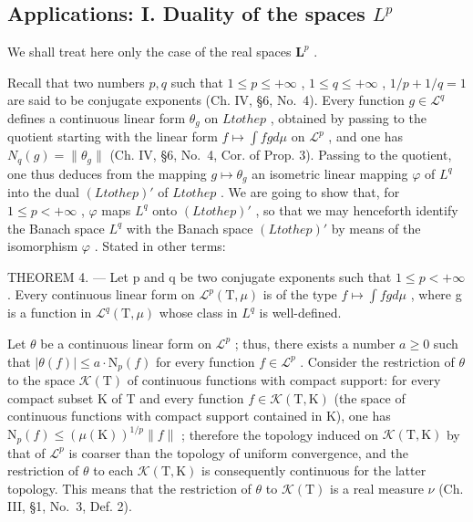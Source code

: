 \subsection{\texorpdfstring{Applications: I. Duality of the spaces \(L^{p}\)}{Applications: I. Duality of the spaces L to the p}}

We shall treat here only the case of the real spaces \(\mathbf{L}^p\) .

Recall that two numbers \(p, q\) such that \(1 \leqslant p \leqslant +\infty\) , \(1 \leqslant q \leqslant +\infty\) , \(1/p + 1/q = 1\) are said to be conjugate exponents (Ch. IV, §6, No.~4). Every function \(g \in \mathcal{L}^q\) defines a continuous linear form \(\theta_g\) on \(L to the p\) , obtained by passing to the quotient starting with the linear form \(f \mapsto \int fg d\mu\) on \(\mathcal{L}^p\) , and one has \(N_q(g) = \| \theta_g \|\) (Ch. IV, §6, No.~4, Cor. of Prop. 3). Passing to the quotient, one thus deduces from the mapping \(g \mapsto \theta_g\) an isometric linear mapping \(\varphi\) of \(L^q\) into the dual \((L to the p)'\) of \(L to the p\) . We are going to show that, for \(1 \leqslant p < +\infty\) , \(\varphi\) maps \(L^q\) onto \((L to the p)'\) , so that we may henceforth identify the Banach space \(L^q\) with the Banach space \((L to the p)'\) by means of the isomorphism \(\varphi\) . Stated in other terms:

THEOREM 4. --- Let p and q be two conjugate exponents such that \(1 \leqslant p < +\infty\) . Every continuous linear form on \(\mathcal{L}^{p}(\mathrm{T}, \mu)\) is of the type \(f \mapsto \int fg d\mu\) , where g is a function in \(\mathcal{L}^{q}(\mathrm{T}, \mu)\) whose class in \(L^{q}\) is well-defined.

Let \(\theta\) be a continuous linear form on \(\mathcal{L}^p\) ; thus, there exists a number \(a \geqslant 0\) such that \(|\theta(f)| \leqslant a \cdot \mathrm{N}_p(f)\) for every function \(f \in \mathcal{L}^p\) . Consider the restriction of \(\theta\) to the space \(\mathcal{K}(\mathrm{T})\) of continuous functions with compact support: for every compact subset K of T and every function \(f \in \mathcal{K}(\mathrm{T}, \mathrm{K})\) (the space of continuous functions with compact support contained in K), one has \(\mathrm{N}_p(f) \leqslant (\mu(\mathrm{K}))^{1/p} \| f \|\) ; therefore the topology induced on \(\mathcal{K}(\mathrm{T}, \mathrm{K})\) by that of \(\mathcal{L}^p\) is coarser than the topology of uniform convergence, and the restriction of \(\theta\) to each \(\mathcal{K}(\mathrm{T}, \mathrm{K})\) is consequently continuous for the latter topology. This means that the restriction of \(\theta\) to \(\mathcal{K}(\mathrm{T})\) is a real measure \(\nu\) (Ch. III, §1, No.~3, Def. 2).

